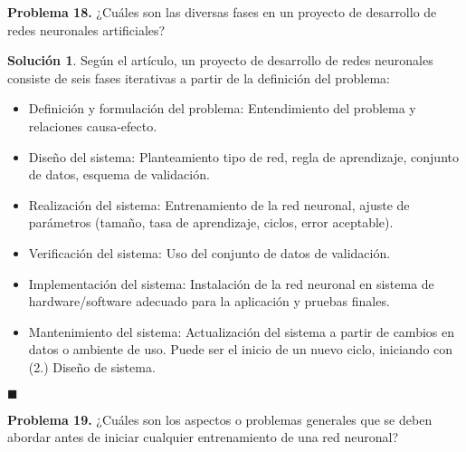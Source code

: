 \documentclass[12pt]{article}
\theoremstyle{plain}
\theoremstyle{definition}
\theoremstyle{definition}
\theoremstyle{definition}
\newtheorem*{solution}{Solución}
\begin{document}
\noindent \textbf{Problema 18.} ¿Cuáles son las diversas fases en un proyecto de desarrollo de redes neuronales artificiales?
\begin{solution}
Según el artículo, un proyecto de desarrollo de redes neuronales consiste de seis fases iterativas a partir de la definición del problema:
\begin{itemize}
    \item Definición y formulación del problema: Entendimiento del problema y relaciones causa-efecto.
    \item Diseño del sistema: Planteamiento tipo de red, regla de aprendizaje, conjunto de datos, esquema de validación.
    \item Realización del sistema: Entrenamiento de la red neuronal, ajuste de parámetros (tamaño, tasa de aprendizaje, ciclos, error aceptable).
    \item Verificación del sistema: Uso del conjunto de datos de validación.
    \item Implementación del sistema: Instalación de la red neuronal en sistema de hardware/software adecuado para la aplicación y pruebas finales.
    \item Mantenimiento del sistema: Actualización del sistema a partir de cambios en datos o ambiente de uso. Puede ser el inicio de un nuevo ciclo, iniciando con (2.) Diseño de sistema.
\end{itemize}
\end{solution}
\begin{flushright}
$\blacksquare$
\end{flushright}

\noindent \textbf{Problema 19.}  ¿Cuáles son los aspectos o problemas generales que se deben abordar antes de iniciar cualquier entrenamiento de una red neuronal?
\end{document}

